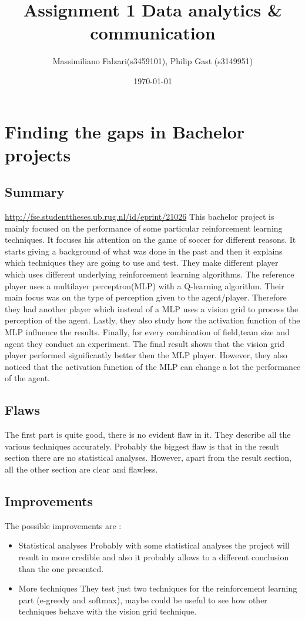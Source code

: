 \documentclass[11pt]{article}
\author{Massimiliano Falzari(s3459101),  Philip Gast (s3149951)}
\date{\today}
\title{Assignment 1 Data analytics \& communication}
\begin{document}
\maketitle
\tableofcontents


\section{Finding the gaps in Bachelor projects}
\label{sec:orgbfc23ba}
\subsection{Summary}
\label{sec:org7a2b804}
\url{http://fse.studenttheses.ub.rug.nl/id/eprint/21026}
This bachelor project is mainly focused on the performance of some
particular reinforcement learning techniques.
It focuses his attention on the game of soccer for different
reasons.  It starts giving a background of what was done in the
past and then it explains which techniques they are going to use
and test. They make different player which uses different
underlying reinforcement learning algorithms. The reference player
uses a multilayer perceptron(MLP) with a Q-learning
algorithm. Their main focus was on the type of perception given to
the agent/player. Therefore they had another player which instead
of a MLP uses a vision grid to process the perception of the agent.
Lastly, they also study how the activation function of the MLP
influence the results.
Finally, for every combination of field,team size and
agent they conduct an experiment. The final result shows that the
vision grid player performed significantly better then the MLP
player. However, they also noticed that the activation function of
the MLP can change a lot the performance of the agent.


\subsection{Flaws}
\label{sec:org2bbcf51}
The first part is quite good, there is no evident flaw in it. They describe all the various techniques accurately.
Probably the biggest flaw is that in the result section there are no statistical analyses.
However, apart from the result section, all the other section are clear and flawless.
\subsection{Improvements}
\label{sec:org0a2362b}
The possible improvements are :
\begin{itemize}
\item Statistical analyses
  Probably with some statistical analyses the project will result in more credible and also it probably allows to a different conclusion than the one presented.
\item More techniques
  They test just two techniques for the reinforcement learning part (e-greedy and softmax),
  maybe could be useful to see how other techniques behave with the vision grid technique.
\end{itemize}
\end{document}
